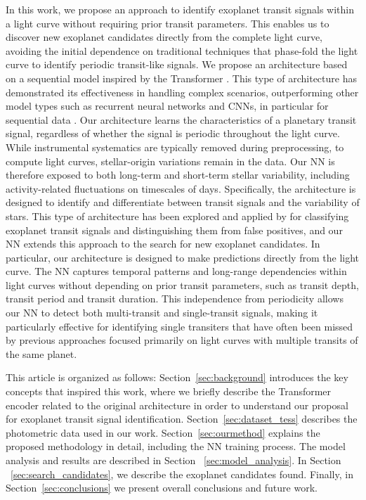 In this work, we propose an approach to identify exoplanet transit signals within a light curve without requiring prior transit parameters. This enables us to discover new exoplanet candidates directly from the complete light curve, avoiding the initial dependence on traditional techniques that phase-fold the light curve to identify periodic transit-like signals. We propose an architecture based on a sequential model inspired by the Transformer \citep{vaswani2017attention}. This type of architecture has demonstrated its effectiveness in handling complex scenarios, outperforming other model types such as recurrent neural networks \citep[RNN;][]{cho2014learning} and CNNs, in particular for sequential data \citep{hawkins2004problem, lakew2018comparison, karita2019comparative}. Our architecture learns the characteristics of a planetary transit signal, regardless of whether the signal is periodic throughout the light curve. While instrumental systematics are typically removed during preprocessing, to compute light curves, stellar-origin variations remain in the data. Our NN is therefore exposed to both long-term and short-term stellar variability, including activity-related fluctuations on timescales of days. Specifically, the architecture is designed to identify and differentiate between transit signals and the variability of stars. This type of architecture has been explored and applied by \cite{10.1093/mnras/stad1173} for classifying exoplanet transit signals and distinguishing them from false positives, and our NN extends this approach to the search for new exoplanet candidates. In particular, our architecture is designed to make predictions directly from the light curve. The NN captures temporal patterns and long-range dependencies within light curves without depending on prior transit parameters, such as transit depth, transit period and transit duration. This independence from periodicity allows our NN to detect both multi-transit and single-transit signals, making it particularly effective for identifying single transiters that have often been missed by previous approaches focused primarily on light curves with multiple transits of the same planet. \par


This article is organized as follows: Section~\ref{sec:background} introduces the key concepts that inspired this work, where we briefly describe the Transformer encoder related to the original architecture \citep{vaswani2017attention} in order to understand our proposal for exoplanet transit signal identification. Section~\ref{sec:dataset_tess} describes the photometric data used in our work. Section~\ref{sec:ourmethod} explains the proposed methodology in detail, including the NN training process. The model analysis and results are described in Section ~\ref{sec:model_analysis}. In Section ~\ref{sec:search_candidates}, we describe the exoplanet candidates found. Finally, in Section~\ref{sec:conclusions} we present overall conclusions and future work. 

